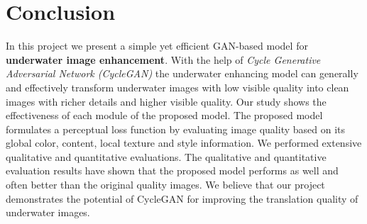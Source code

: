 \documentclass[a4paper]{article}
\begin{document}
\section{Conclusion}
In this project we present a simple yet efficient GAN-based model for \textbf{underwater image enhancement}. With the help of \textit{Cycle Generative Adversarial Network (CycleGAN)} the underwater enhancing model can generally and effectively transform underwater images with low visible quality into clean images with richer details and higher visible quality. Our study shows the effectiveness of each module of the proposed model. The proposed model formulates a perceptual loss function by evaluating image quality based on its global color, content, local texture and style information. We performed extensive qualitative and quantitative evaluations. The qualitative and quantitative evaluation results have shown that the proposed model performs as well and often better than the original quality images. We believe that our project demonstrates the potential of CycleGAN for improving the translation quality of underwater images.



\end{document}
